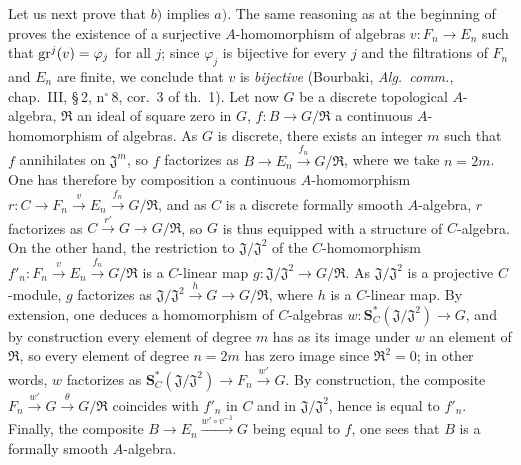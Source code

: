 \begin{env}[19.5.4.3]
\label{0.19.5.4.3}
Let us next prove that $b)$ implies $a)$.
The same reasoning as at the beginning of  proves the existence of a surjective $A$-homomorphism of algebras $v:F_n\to E_n$ such that $\operatorname{gr}^j(v)=\varphi_j$ for all $j$; since $\varphi_j$ is bijective for every $j$ and the filtrations of $F_n$ and $E_n$ are finite, we conclude that $v$ is \emph{bijective} (Bourbaki, \emph{Alg.\ comm.}, chap.~III, \S\,2, n$^\circ$\,8, cor.~3 of th.~1).
Let now $G$ be a discrete topological $A$-algebra, $\mathfrak{R}$ an ideal of square zero in $G$, $f:B\to G/\mathfrak{R}$ a continuous $A$-homomorphism of algebras.
As $G$ is discrete, there exists an integer $m$ such that $f$ annihilates on $\mathfrak{J}^m$, so $f$ factorizes as $B\to E_n\xrightarrow{f_n}G/\mathfrak{R}$, where we take $n=2m$.
One has therefore by composition a continuous $A$-homomorphism $r:C\to F_n\xrightarrow{v}E_n\xrightarrow{f_n}G/\mathfrak{R}$, and as $C$ is a discrete formally smooth $A$-algebra, $r$ factorizes as $C\xrightarrow{r'}G\to G/\mathfrak{R}$, so $G$ is thus equipped with a structure of $C$-algebra.
On the other hand, the restriction to $\mathfrak{J}/\mathfrak{J}^2$ of the $C$-homomorphism $f'_n:F_n\xrightarrow{v}E_n\xrightarrow{f_n}G/\mathfrak{R}$ is a $C$-linear map $g:\mathfrak{J}/\mathfrak{J}^2\to G/\mathfrak{R}$.
As $\mathfrak{J}/\mathfrak{J}^2$ is a projective $C$-module, $g$ factorizes as $\mathfrak{J}/\mathfrak{J}^2\xrightarrow{h}G\to G/\mathfrak{R}$, where $h$ is a $C$-linear map.
By extension, one deduces a homomorphism of $C$-algebras $w:\mathbf{S}_C^*(\mathfrak{J}/\mathfrak{J}^2)\to G$, and by construction every element of degree $m$ has as its image under $w$ an element of $\mathfrak{R}$, so every element of degree $n=2m$ has zero image since $\mathfrak{R}^2=0$;
in other words, $w$ factorizes as $\mathbf{S}_C^*(\mathfrak{J}/\mathfrak{J}^2)\to F_n\xrightarrow{w'}G$.
By construction, the composite $F_n\xrightarrow{w'}G\xrightarrow{\theta}G/\mathfrak{R}$ coincides with $f'_n$ in $C$ and in $\mathfrak{J}/\mathfrak{J}^2$, hence is equal to $f'_n$.
Finally, the composite $B\to E_n\xrightarrow{w'\circ v^{-1}}G$ being equal to $f$, one sees that $B$ is a formally smooth $A$-algebra.
\end{env}

